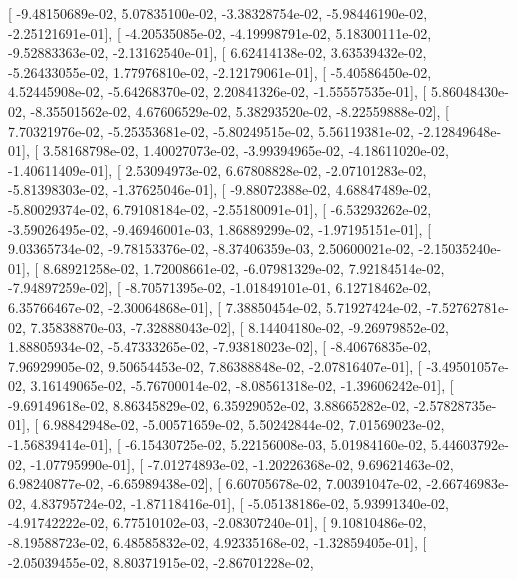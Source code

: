 \documentclass{article}
\begin{document}
       [ -9.48150689e-02,   5.07835100e-02,  -3.38328754e-02,
         -5.98446190e-02,  -2.25121691e-01],
       [ -4.20535085e-02,  -4.19998791e-02,   5.18300111e-02,
         -9.52883363e-02,  -2.13162540e-01],
       [  6.62414138e-02,   3.63539432e-02,  -5.26433055e-02,
          1.77976810e-02,  -2.12179061e-01],
       [ -5.40586450e-02,   4.52445908e-02,  -5.64268370e-02,
          2.20841326e-02,  -1.55557535e-01],
       [  5.86048430e-02,  -8.35501562e-02,   4.67606529e-02,
          5.38293520e-02,  -8.22559888e-02],
       [  7.70321976e-02,  -5.25353681e-02,  -5.80249515e-02,
          5.56119381e-02,  -2.12849648e-01],
       [  3.58168798e-02,   1.40027073e-02,  -3.99394965e-02,
         -4.18611020e-02,  -1.40611409e-01],
       [  2.53094973e-02,   6.67808828e-02,  -2.07101283e-02,
         -5.81398303e-02,  -1.37625046e-01],
       [ -9.88072388e-02,   4.68847489e-02,  -5.80029374e-02,
          6.79108184e-02,  -2.55180091e-01],
       [ -6.53293262e-02,  -3.59026495e-02,  -9.46946001e-03,
          1.86889299e-02,  -1.97195151e-01],
       [  9.03365734e-02,  -9.78153376e-02,  -8.37406359e-03,
          2.50600021e-02,  -2.15035240e-01],
       [  8.68921258e-02,   1.72008661e-02,  -6.07981329e-02,
          7.92184514e-02,  -7.94897259e-02],
       [ -8.70571395e-02,  -1.01849101e-01,   6.12718462e-02,
          6.35766467e-02,  -2.30064868e-01],
       [  7.38850454e-02,   5.71927424e-02,  -7.52762781e-02,
          7.35838870e-03,  -7.32888043e-02],
       [  8.14404180e-02,  -9.26979852e-02,   1.88805934e-02,
         -5.47333265e-02,  -7.93818023e-02],
       [ -8.40676835e-02,   7.96929905e-02,   9.50654453e-02,
          7.86388848e-02,  -2.07816407e-01],
       [ -3.49501057e-02,   3.16149065e-02,  -5.76700014e-02,
         -8.08561318e-02,  -1.39606242e-01],
       [ -9.69149618e-02,   8.86345829e-02,   6.35929052e-02,
          3.88665282e-02,  -2.57828735e-01],
       [  6.98842948e-02,  -5.00571659e-02,   5.50242844e-02,
          7.01569023e-02,  -1.56839414e-01],
       [ -6.15430725e-02,   5.22156008e-03,   5.01984160e-02,
          5.44603792e-02,  -1.07795990e-01],
       [ -7.01274893e-02,  -1.20226368e-02,   9.69621463e-02,
          6.98240877e-02,  -6.65989438e-02],
       [  6.60705678e-02,   7.00391047e-02,  -2.66746983e-02,
          4.83795724e-02,  -1.87118416e-01],
       [ -5.05138186e-02,   5.93991340e-02,  -4.91742222e-02,
          6.77510102e-03,  -2.08307240e-01],
       [  9.10810486e-02,  -8.19588723e-02,   6.48585832e-02,
          4.92335168e-02,  -1.32859405e-01],
       [ -2.05039455e-02,   8.80371915e-02,  -2.86701228e-02,
\end{document}
